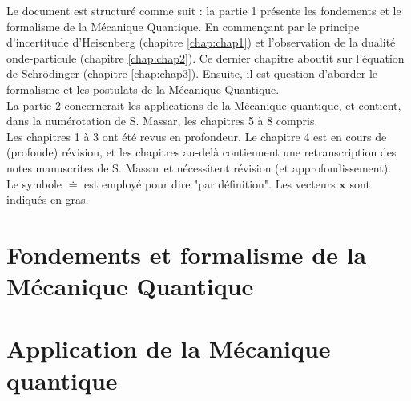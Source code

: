 \documentclass{book}
\numberwithin{equation}{part}
\begin{document}
Le document est structuré comme suit : la partie 1 présente les fondements et le formalisme de la Mécanique Quantique. En commençant par le principe d'incertitude d'Heisenberg (chapitre \ref{chap:chap1}) et l'observation de la dualité onde-particule (chapitre \ref{chap:chap2}). Ce dernier chapitre aboutit sur l'équation de Schrödinger (chapitre \ref{chap:chap3}). Ensuite, il est question d'aborder le formalisme et les postulats de la Mécanique Quantique. \\

La partie 2 concernerait les applications de la Mécanique quantique, et contient, dans la numérotation de S. Massar, les chapitres 5 à 8 compris. \\

Les chapitres 1 à 3 ont été revus en profondeur. Le chapitre 4 est en cours de (profonde) révision, et les chapitres au-delà contiennent une retranscription des notes manuscrites de S. Massar et nécessitent révision (et approfondissement). \\

Le symbole $\doteq$ est employé pour dire "par définition". Les vecteurs $\bm{x}$ sont indiqués en gras.


\newpage
\tableofcontents

\part{Fondements et formalisme de la Mécanique Quantique}
\newpage
\newpage
\newpage
\newpage

\part{Application de la Mécanique quantique}

\newpage
\newpage

\newpage
\end{document}
